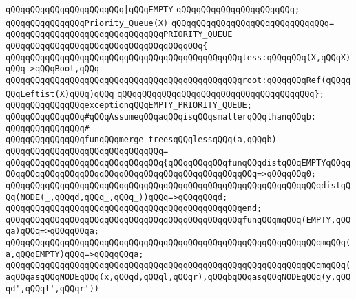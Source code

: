 \verb|qQQqqQQqqQQqqQQqqQQqqQQq|\verb#|qQQqEMPTY#\newline
\verb|qQQqqQQqqQQqqQQqqQQqqQQq;|\newline
\newline
\verb|qQQqqQQqqQQqqQQqPriority_Queue(X)|\newline
\verb|qQQqqQQqqQQqqQQqqQQqqQQqqQQqqQQq=|\newline
\verb|qQQqqQQqqQQqqQQqqQQqqQQqqQQqqQQqPRIORITY_QUEUE|\newline
\verb|qQQqqQQqqQQqqQQqqQQqqQQqqQQqqQQqqQQqqQQq{|\newline
\verb|qQQqqQQqqQQqqQQqqQQqqQQqqQQqqQQqqQQqqQQqqQQqqQQqless:qQQqqQQq(X,qQQqX)qQQq->qQQqBool,qQQq|\newline
\verb|qQQqqQQqqQQqqQQqqQQqqQQqqQQqqQQqqQQqqQQqqQQqqQQqroot:qQQqqQQqRef(qQQqqQQqLeftist(X)qQQq)qQQq|\newline
\verb|qQQqqQQqqQQqqQQqqQQqqQQqqQQqqQQqqQQqqQQq};|\newline
\newline
\verb|qQQqqQQqqQQqqQQqexceptionqQQqEMPTY_PRIORITY_QUEUE;|\newline
\newline
\verb|qQQqqQQqqQQqqQQq#qQQqAssumeqQQqaqQQqisqQQqsmallerqQQqthanqQQqb:|\newline
\verb|qQQqqQQqqQQqqQQq#|\newline
\verb|qQQqqQQqqQQqqQQqfunqQQqmerge_treesqQQqlessqQQq(a,qQQqb)|\newline
\verb|qQQqqQQqqQQqqQQqqQQqqQQqqQQqqQQq=|\newline
\verb|qQQqqQQqqQQqqQQqqQQqqQQqqQQqqQQq{qQQqqQQqqQQqfunqQQqdistqQQqEMPTYqQQqqQQqqQQqqQQqqQQqqQQqqQQqqQQqqQQqqQQqqQQqqQQqqQQqqQQq=>qQQqqQQq0;|\newline
\verb|qQQqqQQqqQQqqQQqqQQqqQQqqQQqqQQqqQQqqQQqqQQqqQQqqQQqqQQqqQQqqQQqdistqQQq(NODE(_,qQQqd,qQQq_,qQQq_))qQQq=>qQQqqQQqd;|\newline
\verb|qQQqqQQqqQQqqQQqqQQqqQQqqQQqqQQqqQQqqQQqqQQqqQQqend;|\newline
\newline
\verb|qQQqqQQqqQQqqQQqqQQqqQQqqQQqqQQqqQQqqQQqqQQqqQQqfunqQQqmqQQq(EMPTY,qQQqa)qQQq=>qQQqqQQqa;|\newline
\verb|qQQqqQQqqQQqqQQqqQQqqQQqqQQqqQQqqQQqqQQqqQQqqQQqqQQqqQQqqQQqqQQqmqQQq(a,qQQqEMPTY)qQQq=>qQQqqQQqa;|\newline
\newline
\verb|qQQqqQQqqQQqqQQqqQQqqQQqqQQqqQQqqQQqqQQqqQQqqQQqqQQqqQQqqQQqqQQqmqQQq(aqQQqasqQQqNODEqQQq(x,qQQqd,qQQql,qQQqr),qQQqbqQQqasqQQqNODEqQQq(y,qQQqd',qQQql',qQQqr'))|\newline
